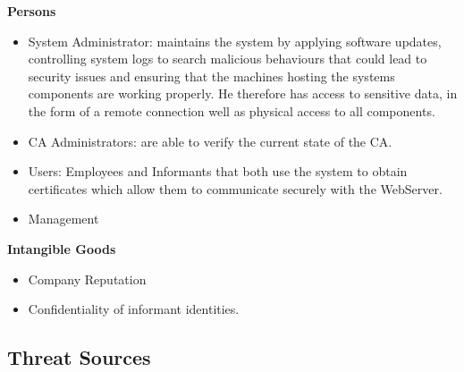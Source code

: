 \documentclass[english]{article}
\begin{document}
\noindent\textbf{Persons}
\begin{itemize}
\item System Administrator: maintains the system by applying software updates, controlling system logs to search malicious behaviours that could lead to security issues and ensuring that the machines hosting the systems components are working properly. He therefore has access to sensitive data, in the form of a remote connection well as physical access to all components.
\item CA Administrators: are able to verify the current state of the CA.
\item Users: Employees and Informants that both use the system to obtain certificates which allow them to communicate securely with the WebServer.
\item Management
\end{itemize}

\noindent\textbf{Intangible Goods}
\begin{itemize}
\item Company Reputation
\item Confidentiality of informant identities.
\end{itemize}

\subsection{Threat Sources}

\end{document}
